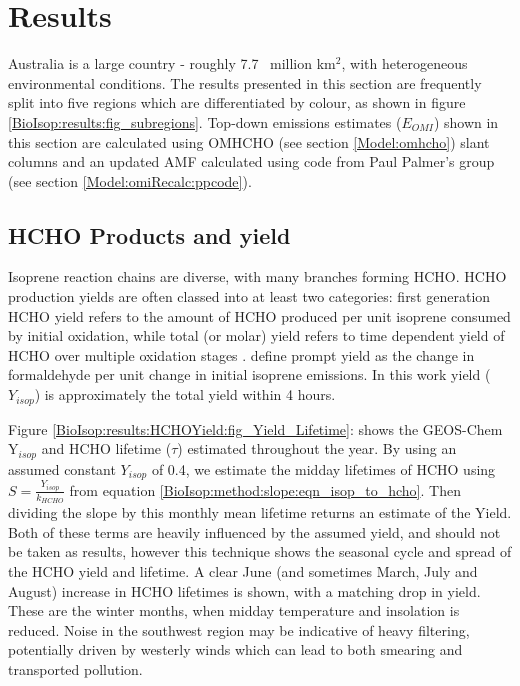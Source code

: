 \section{Results}
  \label{BioIsop:results}
  
  Australia is a large country - roughly 7.7~ million km$^{2}$, with heterogeneous environmental conditions.
  The results presented in this section are frequently split into five regions which are differentiated by colour, as shown in figure \ref{BioIsop:results:fig_subregions}.
  Top-down emissions estimates ($E_{OMI}$) shown in this section are calculated using OMHCHO (see section \ref{Model:omhcho}) slant columns and an updated AMF calculated using code from Paul Palmer's group (see section \ref{Model:omiRecalc:ppcode}). 
  
  
  \subsection{HCHO Products and yield}
    \label{BioIsop:results:HCHOYield}
    
    Isoprene reaction chains are diverse, with many branches forming HCHO.
    HCHO production yields are often classed into at least two categories: first generation HCHO yield refers to the amount of HCHO produced per unit isoprene consumed by initial oxidation, while total (or molar) yield refers to time dependent yield of HCHO over multiple oxidation stages \parencite{Wolfe2016}.
    \textcite{Wolfe2016} define prompt yield as the change in formaldehyde per unit change in initial isoprene emissions.
    In this work yield ($Y_{isop}$) is approximately the total yield within 4 hours.
    
    Figure \ref{BioIsop:results:HCHOYield:fig_Yield_Lifetime}: shows the GEOS-Chem Y$_{isop}$ and HCHO lifetime ($\tau$) estimated throughout the year.
    By using an assumed constant $Y_{isop}$ of 0.4, we estimate the midday lifetimes of HCHO using $S = \frac{Y_{isop}}{k_{HCHO}}$ from equation \ref{BioIsop:method:slope:eqn_isop_to_hcho}.
    Then dividing the slope by this monthly mean lifetime returns an estimate of the Yield.
    Both of these terms are heavily influenced by the assumed yield, and should not be taken as results, however this technique shows the seasonal cycle and spread of the HCHO yield and lifetime.
    A clear June (and sometimes March, July and August) increase in HCHO lifetimes is shown, with a matching drop in yield. 
    These are the winter months, when midday temperature and insolation is reduced.
    Noise in the southwest region may be indicative of heavy filtering, potentially driven by westerly winds which can lead to both smearing and transported pollution.
    

